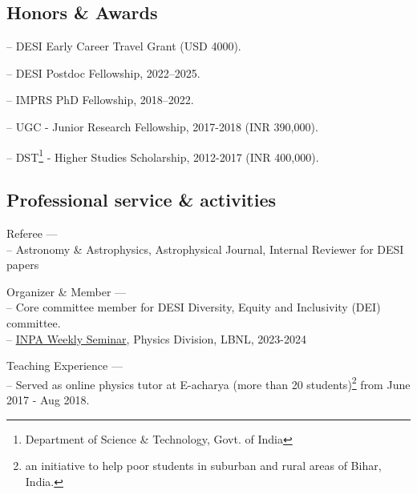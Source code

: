 \documentclass[12pt,letterpaper]{article}
\begin{document}
\subsection{Honors \& Awards}
\begin{list}{}{\cvlist}
  \item -- DESI Early Career Travel Grant (USD 4000).
  \item -- DESI Postdoc Fellowship, 2022--2025.
  \item -- IMPRS PhD Fellowship, 2018--2022.
  \item -- UGC - Junior Research Fellowship, 2017-2018 (INR 390,000).
  \item -- DST\footnote{Department of Science \& Technology, Govt. of India} -  Higher Studies Scholarship, 2012-2017 (INR 400,000).
\end{list}


\subsection{Professional service \& activities}
\begin{list}{}{\cvlist}
    \item Referee --- \\
    -- Astronomy \& Astrophysics, Astrophysical Journal, Internal Reviewer for DESI papers
    \item Organizer \& Member --- \\
        -- Core committee member for DESI Diversity, Equity and Inclusivity (DEI) committee. \\
        -- \href{https://inpa.lbl.gov/events/}{INPA Weekly Seminar}, Physics Division, LBNL, 2023-2024 \\
       \item Teaching Experience --- \\
        -- Served as online physics tutor at E-acharya (more than 20 students)\footnote{an initiative to help poor students in suburban and rural areas of Bihar, India.} from June 2017 - Aug 2018. \\
        \end{list}
\end{document}

